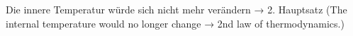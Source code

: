 Die innere Temperatur würde sich nicht mehr verändern → 2. Hauptsatz  
(The internal temperature would no longer change → 2nd law of thermodynamics.)
